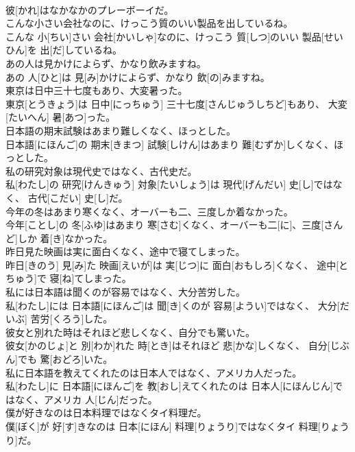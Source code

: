 \documentclass[8pt]{extreport}
\begin{document}
\begin{CJK}{UTF8}{min}
\\	彼[かれ]はなかなかのプレーボーイだ。
\\	こんな小さい会社なのに、けっこう質のいい製品を出しているね。	
\\	こんな 小[ちい]さい 会社[かいしゃ]なのに、けっこう 質[しつ]のいい 製品[せいひん]を 出[だ]しているね。
\\	あの人は見かけによらず、かなり飲みますね。	
\\	あの 人[ひと]は 見[み]かけによらず、かなり 飲[の]みますね。
\\	東京は日中三十七度もあり、大変暑った。	
\\	東京[とうきょう]は 日中[にっちゅう] 三十七度[さんじゅうしちど]もあり、 大変[たいへん] 暑[あつ]った。
\\	日本語の期末試験はあまり難しくなく、ほっとした。	
\\	日本語[にほんご]の 期末[きまつ] 試験[しけん]はあまり 難[むずか]しくなく、ほっとした。
\\	私の研究対象は現代史ではなく、古代史だ。	
\\	私[わたし]の 研究[けんきゅう] 対象[たいしょう]は 現代[げんだい] 史[し]ではなく、 古代[こだい] 史[し]だ。
\\	今年の冬はあまり寒くなく、オーバーも二、三度しか着なかった。	
\\	今年[ことし]の 冬[ふゆ]はあまり 寒[さむ]くなく、オーバーも二[に]、三度[さんど]しか 着[き]なかった。
\\	昨日見た映画は実に面白くなく、途中で寝てしまった。	
\\	昨日[きのう] 見[み]た 映画[えいが]は 実[じつ]に 面白[おもしろ]くなく、 途中[とちゅう]で 寝[ね]てしまった。
\\	私には日本語は聞くのが容易ではなく、大分苦労した。	
\\	私[わたし]には 日本語[にほんご]は 聞[き]くのが 容易[ようい]ではなく、 大分[だいぶ] 苦労[くろう]した。
\\	彼女と別れた時はそれほど悲しくなく、自分でも驚いた。	
\\	彼女[かのじょ]と 別[わか]れた 時[とき]はそれほど 悲[かな]しくなく、 自分[じぶん]でも 驚[おどろ]いた。
\\	私に日本語を教えてくれたのは日本人ではなく、アメリカ人だった。	
\\	私[わたし]に 日本語[にほんご]を 教[おし]えてくれたのは 日本人[にほんじん]ではなく、アメリカ 人[じん]だった。
\\	僕が好きなのは日本料理ではなくタイ料理だ。	
\\	僕[ぼく]が 好[す]きなのは 日本[にほん] 料理[りょうり]ではなくタイ 料理[りょうり]だ。

\end{CJK}
\end{document}
